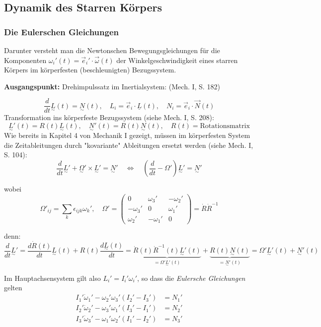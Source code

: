\documentclass[10pt, letterpaper]{article}
\begin{document}
\pagebreak


\subsection{Dynamik des Starren Körpers}



\subsubsection{Die Eulerschen Gleichungen}

Darunter versteht man die Newtonschen Bewegungsgleichungen für die Komponenten $\omega_i'(t) = \vec{e}_i' \cdot \vec{\omega}(t)$ der Winkelgeschwindigkeit eines starren Körpers im körperfesten (beschleunigten) Bezugssystem.

\noindent
\textbf{Ausgangspunkt:} Drehimpulssatz im Inertialsystem: (Mech. I, S. 182)

\[\frac{d}{dt} \underset{\sim}{L}(t) = \underset{\sim}{N}(t), \quad L_i = \vec{e}_i \cdot \underline{L}(t), \quad N_i = \vec{e}_i \cdot \vec{N}(t)\]
Transformation ins körperfeste Bezugssystem (siehe Mech. I, S. 208):
\[\underset{\sim}{L}'(t) = R(t)\underset{\sim}{L}(t), \quad \underset{\sim}{N}'(t) = R(t)\underset{\sim}{N}(t), \quad R(t) = \text{Rotationsmatrix}\]
Wie bereits in Kapitel 4 von Mechanik I gezeigt, müssen im körperfesten System die Zeitableitungen durch "kovariante" Ableitungen ersetzt werden (siehe Mech. I, S. 104):
\[\frac{d}{dt}\underset{\sim}{L}' + \underset{\sim}{\Omega}' \times \underset{\sim}{L}' = \underset{\sim}{N}' \quad \Leftrightarrow \quad \left(\frac{d}{dt} - \Omega'\right)\underset{\sim}{L}' = \underset{\sim}{N}'\]

wobei \[\Omega'_{ij} = \sum_k \epsilon_{ijk}\omega_k', \quad \Omega' = \begin{pmatrix} 0 & \omega_3' & -\omega_2' \\ -\omega_3' & 0 & \omega_1' \\ \omega_2' & -\omega_1' & 0 \end{pmatrix} = \dot{R}\dot{R}^{-1}\]

denn: 
\[\frac{d}{dt}\underset{\sim}{L}' = \frac{d\dot{R}(t)}{dt}\underset{\sim}{L}(t) + R(t)\frac{d\underset{\sim}{L}(t)}{dt} = \underbrace{\dot{R}(t)\dot{R}^{-1}(t)\underset{\sim}{L}'(t)}_{=\Omega'\underset{\sim}{L}'(t)} + \underbrace{R(t)\underset{\sim}{N}(t)}_{=\underset{\sim}{N}'(t)}= \Omega'\underset{\sim}{L}'(t)+\underset{\sim}{N}'(t)\]

Im Hauptachsensystem gilt also $L_i' = I_i' \omega_i'$, so dass die \textit{Eulersche Gleichungen} gelten
\begin{align*}
I_1' \dot{\omega}_1' - \omega_2' \omega_3' (I_2'-I_3') &= N_1' \\
I_2' \dot{\omega}_2' - \omega_3' \omega_1' (I_3'-I_1') &= N_2' \\
I_3' \dot{\omega}_3' - \omega_1' \omega_2' (I_1'-I_2') &= N_3'
\end{align*}
\end{document}

